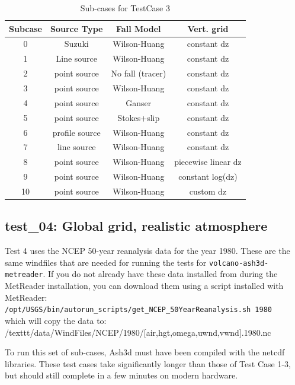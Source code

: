 \small
\begin{table}[htbp]
\begin{center}
\begin{tabular}{| c | c | c | c |}
\hline
Subcase & Source Type & Fall Model & Vert. grid \\
\hline
0  & Suzuki         & Wilson-Huang     & constant dz \\
1  & Line source    & Wilson-Huang     & constant dz \\
2  & point source   & No fall (tracer) & constant dz \\
3  & point source   & Wilson-Huang     & constant dz \\
4  & point source   & Ganser           & constant dz \\
5  & point source   & Stokes+slip      & constant dz \\
6  & profile source & Wilson-Huang     & constant dz \\
7  & line source    & Wilson-Huang     & constant dz \\
8  & point source   & Wilson-Huang     & piecewise linear dz \\
9  & point source   & Wilson-Huang     & constant log(dz) \\
10 & point source   & Wilson-Huang     & custom dz \\
\hline
\end{tabular}
\caption{\label{tab:TC3Subcases}Sub-cases for TestCase 3}
\end{center}
\end{table}
\normalsize

\subsection{test\_04: Global grid, realistic atmosphere}
Test 4 uses the NCEP 50-year reanalysis data for the year 1980. These
are the same windfiles that are needed for running the tests
for \texttt{volcano-ash3d-metreader}. If you do not already have
these data installed from during the MetReader installation, you can
download them using a script installed with MetReader:\\
\texttt{/opt/USGS/bin/autorun\_scripts/get\_NCEP\_50YearReanalysis.sh 1980}\\
which will copy the data to:\\
/texttt{/data/WindFiles/NCEP/1980/[air,hgt,omega,uwnd,vwnd].1980.nc}

To run this set of sub-cases, Ash3d must have been compiled with the
netcdf libraries. These test cases take significantly longer than those
of Test Case 1-3, but should still complete in a few minutes on modern
hardware.


